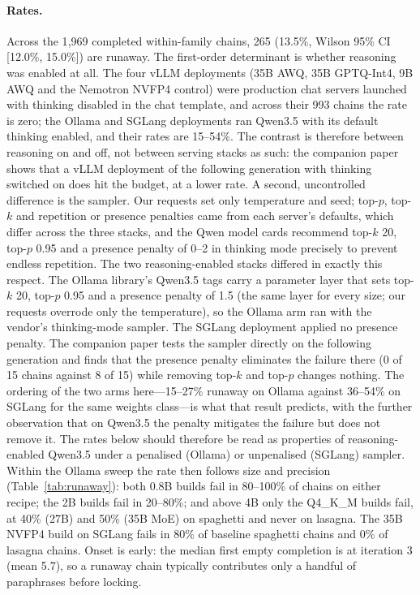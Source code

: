 \documentclass[11pt]{article}
\begin{document}
\paragraph{Rates.}
Across the 1{,}969 completed within-family chains, 265 (13.5\%, Wilson 95\%
CI [12.0\%, 15.0\%]) are runaway. The first-order determinant is whether
reasoning was enabled at all. The four vLLM deployments (35B AWQ, 35B
GPTQ-Int4, 9B AWQ and the Nemotron NVFP4 control) were production chat
servers launched with thinking disabled in the chat template, and across
their 993 chains the rate is zero; the Ollama and SGLang deployments ran
Qwen3.5 with its default thinking enabled, and their rates are 15--54\%. The
contrast is therefore between reasoning on and off, not between serving
stacks as such: the companion paper shows that a vLLM deployment of the
following generation with thinking switched on does hit the budget, at a
lower rate. A second, uncontrolled difference is the sampler. Our requests
set only temperature and seed; top-$p$, top-$k$ and repetition or presence
penalties came from each server's defaults, which differ across the three
stacks, and the Qwen model cards recommend top-$k$ 20, top-$p$ 0.95 and a
presence penalty of 0--2 in thinking mode precisely to prevent endless
repetition. The two reasoning-enabled stacks differed in exactly this respect. The
Ollama library's Qwen3.5 tags carry a parameter layer that sets
top-$k$ 20, top-$p$ 0.95 and a presence penalty of 1.5 (the same layer for
every size; our requests overrode only the temperature), so the Ollama arm
ran with the vendor's thinking-mode sampler. The SGLang deployment applied
no presence penalty. The companion paper tests the sampler directly on the
following generation and finds that the presence penalty eliminates the
failure there (0 of 15 chains against 8 of 15) while removing top-$k$ and
top-$p$ changes nothing. The ordering of the two arms here---15--27\%
runaway on Ollama against 36--54\% on SGLang for the same weights
class---is what that result predicts, with the further observation that on
Qwen3.5 the penalty mitigates the failure but does not remove it. The rates
below should therefore be read as properties of reasoning-enabled Qwen3.5
under a penalised (Ollama) or unpenalised (SGLang) sampler. Within the Ollama sweep the rate
then follows size and precision (Table~\ref{tab:runaway}): both 0.8B builds fail
in 80--100\% of chains on either recipe; the 2B builds fail in 20--80\%; and
above 4B only the Q4\_K\_M builds fail, at 40\% (27B) and 50\% (35B MoE) on
spaghetti and never on lasagna. The 35B NVFP4 build on SGLang fails in 80\%
of baseline spaghetti chains and 0\% of lasagna chains. Onset is early: the
median first empty completion is at iteration 3 (mean 5.7), so a runaway
chain typically contributes only a handful of paraphrases before locking.
\end{document}
